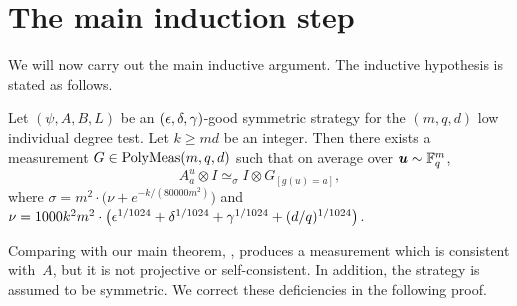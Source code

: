 \section{The main induction step}
\label{sec:induction}

We will now carry out the main inductive argument. 
The inductive hypothesis is stated as follows.

\begin{theorem}\label{thm:main-induction}
  Let $(\psi, A, B, L)$ be an $(\epsilon, \delta, \gamma)$-good symmetric strategy
  for the $(m,q,d)$ low individual degree test. Let $k \geq md$ be an integer.
  Then there exists a measurement $G \in \mathrm{PolyMeas}(m, q, d)$ such that on
  average over $\boldsymbol{u} \sim \mathbb F_q^{m}$,
	\begin{equation*}
	  A^{u}_a \otimes I \simeq_{\sigma} I \otimes G_{[g(u)=a]},
	\end{equation*}
  where $\sigma = m^2 \cdot \bigl(\nu + e^{-k/(80000m^2)}\bigr)$ and
  $\nu = 1000k^2 m^2 \cdot\big(\epsilon^{1/1024} + \delta^{1/1024} + \gamma^{1/1024} + (d/q)^{1/1024}\big)$.
  
\end{theorem}

Comparing with our main theorem, ,
 produces a measurement which is consistent with~$A$,
but it is not projective or self-consistent.
In addition, the strategy is assumed to be symmetric.
We correct these deficiencies in the following proof.

